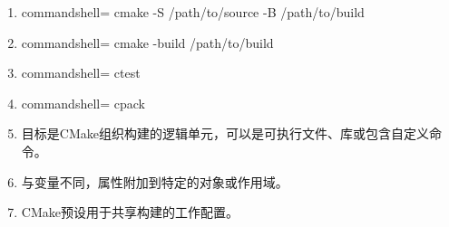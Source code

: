 

\begin{enumerate}
\item 
\begin{tcblisting}{commandshell={}}
cmake -S /path/to/source -B /path/to/build
\end{tcblisting}

\item 
\begin{tcblisting}{commandshell={}}
cmake -build /path/to/build
\end{tcblisting}

\item 
\begin{tcblisting}{commandshell={}}
ctest
\end{tcblisting}

\item 
\begin{tcblisting}{commandshell={}}
cpack
\end{tcblisting}

\item 
目标是CMake组织构建的逻辑单元，可以是可执行文件、库或包含自定义命令。

\item 
与变量不同，属性附加到特定的对象或作用域。

\item 
CMake预设用于共享构建的工作配置。
\end{enumerate}